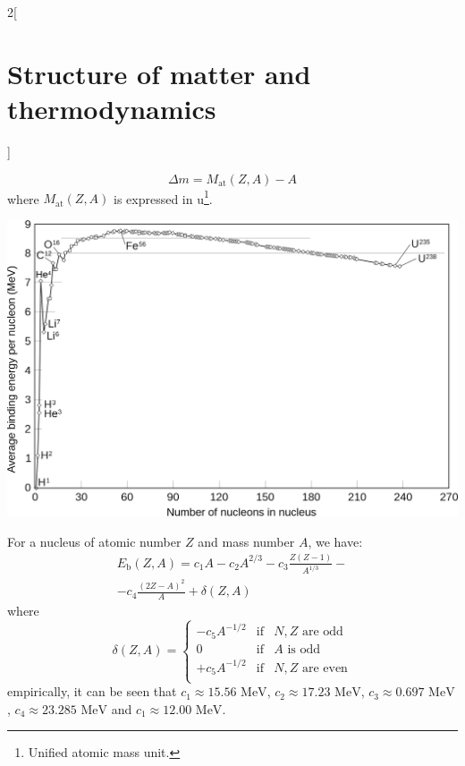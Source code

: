 \documentclass[../../../main.tex]{subfiles}
\begin{document}
\begin{multicols}{2}[\section{Structure of matter and thermodynamics}]
\begin{prop}
        $$\Delta m=M_\text{at}(Z,A)-A$$ where $M_\text{at}(Z,A)$ is expressed in u\footnote{Unified atomic mass unit.}.
    \end{prop}
    \begin{center}
        \begin{minipage}{\linewidth}
            \centering
            \includegraphics[width=\linewidth]{Images/Binding_energy.png}
        \end{minipage}
    \end{center}
    \begin{prop}
        For a nucleus of atomic number $Z$ and mass number $A$, we have:
        \begin{multline*}
            E_\text{b}(Z,A)=c_1A-c_2A^{2/3}-c_3\frac{Z(Z-1)}{A^{1/3}}-\\-c_4\frac{{(2Z-A)}^2}{A}+\delta(Z,A)
        \end{multline*}
        where
        $$\delta(Z,A)=\left\{
            \begin{array}{lll}
                -c_5A^{-1/2} & \text{if} & N, Z\text{ are odd}  \\
                0            & \text{if} & A\text{ is odd}      \\
                +c_5A^{-1/2} & \text{if} & N, Z\text{ are even} \\
            \end{array}
            \right.$$
        empirically, it can be seen that $c_1\approx 15.56\text{ MeV}$, $c_2\approx 17.23\text{ MeV}$, $c_3\approx 0.697\text{ MeV}$, $c_4\approx 23.285\text{ MeV}$ and $c_1\approx 12.00\text{ MeV}$.
    \end{prop}

\end{multicols}
\end{document}
